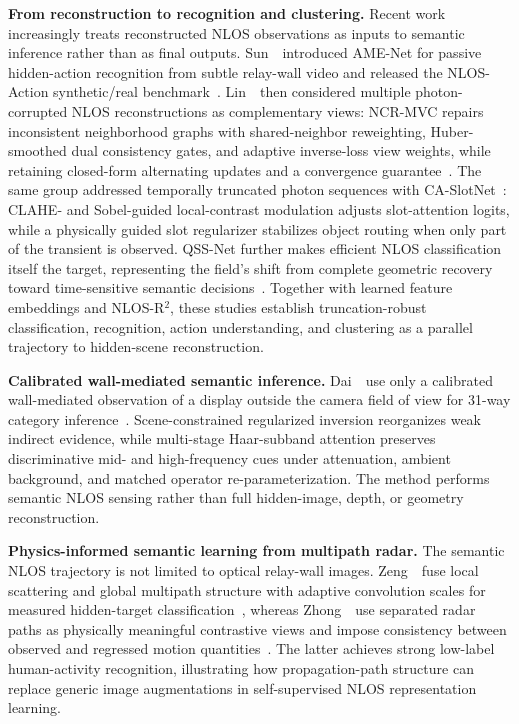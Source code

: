 \vspace{0.8mm}
\noindent \textbf{From reconstruction to recognition and clustering.}
Recent work increasingly treats reconstructed NLOS observations as inputs to semantic inference rather than as final outputs. Sun~\etal~introduced AME-Net for passive hidden-action recognition from subtle relay-wall video and released the NLOS-Action synthetic/real benchmark~\cite{sunAdaptiveMotionNLOS2025}. Lin~\etal~then considered multiple photon-corrupted NLOS reconstructions as complementary views: NCR-MVC repairs inconsistent neighborhood graphs with shared-neighbor reweighting, Huber-smoothed dual consistency gates, and adaptive inverse-loss view weights, while retaining closed-form alternating updates and a convergence guarantee~\cite{linNCRMultiViewNLOS2026}. The same group addressed temporally truncated photon sequences with CA-SlotNet~\cite{linCASlotNetNLOS2025}: CLAHE- and Sobel-guided local-contrast modulation adjusts slot-attention logits, while a physically guided slot regularizer stabilizes object routing when only part of the transient is observed. QSS-Net further makes efficient NLOS classification itself the target, representing the field's shift from complete geometric recovery toward time-sensitive semantic decisions~\cite{linQSSNetNLOS2026}. Together with learned feature embeddings and NLOS-R$^2$, these studies establish truncation-robust classification, recognition, action understanding, and clustering as a parallel trajectory to hidden-scene reconstruction.

\vspace{0.8mm}
\noindent \textbf{Calibrated wall-mediated semantic inference.}
Dai~\etal~use only a calibrated wall-mediated observation of a display outside the camera field of view for 31-way category inference~\cite{daiSCISANet2026}. Scene-constrained regularized inversion reorganizes weak indirect evidence, while multi-stage Haar-subband attention preserves discriminative mid- and high-frequency cues under attenuation, ambient background, and matched operator re-parameterization. The method performs semantic NLOS sensing rather than full hidden-image, depth, or geometry reconstruction.




\vspace{0.8mm}
\noindent \textbf{Physics-informed semantic learning from multipath radar.}
The semantic NLOS trajectory is not limited to optical relay-wall images. Zeng~\etal~fuse local scattering and global multipath structure with adaptive convolution scales for measured hidden-target classification~\cite{zengMultipathFeatureFusionNLOS2026}, whereas Zhong~\etal~use separated radar paths as physically meaningful contrastive views and impose consistency between observed and regressed motion quantities~\cite{zhongMultipathContrastiveNLOS2026}. The latter achieves strong low-label human-activity recognition, illustrating how propagation-path structure can replace generic image augmentations in self-supervised NLOS representation learning.

